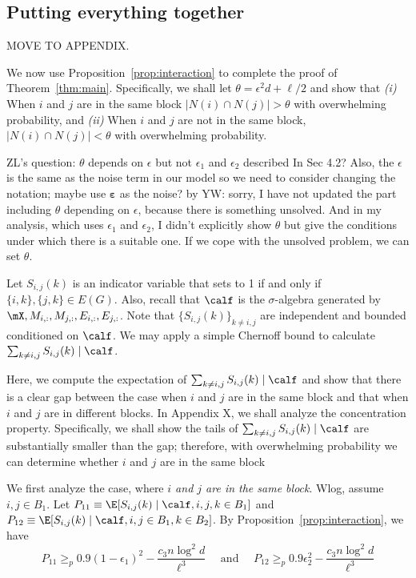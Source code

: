 
\subsection{Putting everything together}
{\color{red} MOVE TO APPENDIX.}

We now use Proposition~\ref{prop:interaction} to complete the proof of Theorem~\ref{thm:main}.  Specifically, we shall let {\color{blue} $\theta = \epsilon^2 d + \ell/2$} and show that \emph{(i)} When $i$ and $j$ are in the same block $|N(i) \cap N(j)| > \theta$ with overwhelming probability, and \emph{(ii)} When $i$ and $j$ are not in the same block, $|N(i) \cap N(j)| < \theta$ with overwhelming probability.


{\color{red} ZL's question: $\theta$ depends on $\epsilon$ but not $\epsilon_1$ and $\epsilon_2$ described In Sec 4.2? Also, the $\epsilon$ is the same as the noise term in our model so we need to consider changing the notation; maybe use $\mathbf{\varepsilon}$ as the noise?}
{\color{blue}by YW: sorry, I have not updated the part including $\theta$ depending on $\epsilon$, because there is something unsolved. And in my analysis, which uses $\epsilon_1$ and $\epsilon_2$, I didn't explicitly show $\theta$ but give the conditions under which there is a suitable one. If we cope with the unsolved problem, we can set $\theta$.}

Let $S_{i,j}(k)$ is an indicator variable that sets to 1 if and only if $\{i, k\}, \{j, k\} \in E(G)$. Also, recall that $\calf$ is the $\sigma$-algebra generated by $\mX, M_{i,:}, M_{j,:}, E_{i,:}, E_{j,:}$. Note that $\{S_{i,j}(k)\}_{k \neq i,j}$ are independent and bounded conditioned on $\calf$. We may apply a simple Chernoff bound to calculate $\sum_{k \neq i, j}S_{i,j}(k)\mid \calf$. 

Here, we compute the expectation of $\sum_{k \neq i, j}S_{i,j}(k)\mid \calf$ and show that there is a clear gap between the case when $i$ and $j$ are in the same block and that when $i$ and $j$ are in different blocks. {\color{red} In Appendix X,} we shall analyze the concentration property. Specifically, we shall show the tails of $\sum_{k \neq i, j}S_{i,j}(k)\mid \calf$ are substantially smaller than the gap; therefore, with overwhelming probability we can determine whether $i$ and $j$ are in the same block

 We first analyze the case, where \emph{$i$ and $j$ are in the same block}.  Wlog, assume $i,j \in B_1$. Let $P_{11} \equiv \E[S_{i,j}(k)\mid \calf,i,j,k\in B_1]$ and $P_{12} \equiv \E[S_{i,j}(k)\mid \calf, i,j\in B_1,k \in B_2]$. By Proposition~\ref{prop:interaction}, we have 
\begin{equation}
    P_{11} \geq_p 0.9(1-\epsilon_1)^2 - \frac{c_3 n \log^2d}{ \ell^{3}} \quad \mbox{ and } \quad 
    P_{12} \geq_p 0.9\epsilon^2_2 - \frac{c_3 n \log^2d}{ \ell^{3}}
\end{equation}

